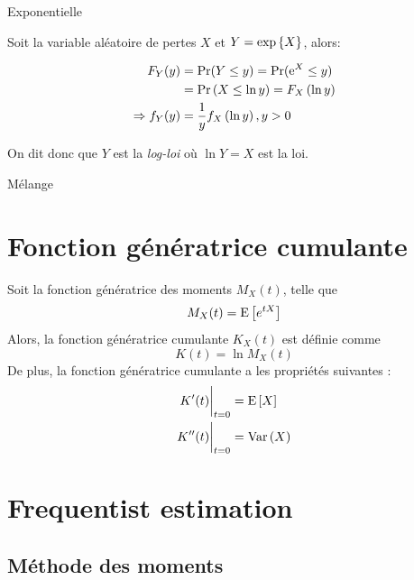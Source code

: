 \documentclass[10pt, french]{article}
\begin{document}
\begin{multicols*}{3}
\begin{algo}{Exponentielle}

Soit la variable aléatoire de pertes $X$ et $Y = \text{exp}\left\{X\right\}$, alors:

\begin{align*}
	F_Y(y)
	&=	\Pr(Y \leq y)	
	=	\Pr(\mathrm{e}^{X} \leq y)	\\
	&=	\Pr\left(X \leq \ln y \right)	
	=	F_X\left(\ln y \right)	\\
\Rightarrow	f_Y(y)
	&=	\frac{1}{y} f_X\left(\ln y \right), y > 0
\end{align*}

On dit donc que $Y$ est la \textit{log-loi} où $\ln Y = X$ est la loi.

\end{algo}

\begin{algo}{Mélange}

\end{algo}

%

%

\setcounter{section}{8}

\section{Fonction génératrice cumulante}
Soit la fonction génératrice des moments $M_X(t)$, telle que
\[M_X(t) = \mathrm{E} \left[ e^{tX} \right]\]
Alors, la fonction génératrice cumulante $K_X(t)$ est définie comme
\[K(t) = \ln M_X(t)\]
De plus, la fonction génératrice cumulante a les propriétés suivantes : 
\begin{align*}
K'(t) \biggr \rvert_{t = 0} & =   \mathrm{E} \left[ X \right] \\
K''(t) \biggr \rvert_{t=0} & = \mathrm{Var} \left( X \right) \\
\end{align*}

\setcounter{section}{9}
\section{Frequentist estimation}
\subsection*{Méthode des moments}


\end{multicols*}
\end{document}
